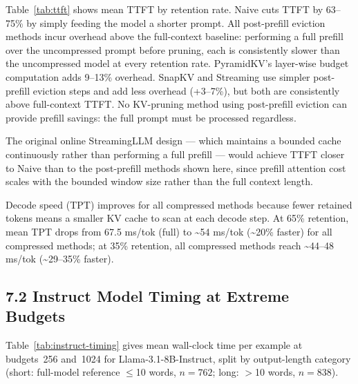 \documentclass[10pt,letterpaper]{article}
\begin{document}
Table~\ref{tab:ttft} shows mean TTFT by retention rate.
Naive cuts TTFT by 63--75\% by simply feeding the model a shorter
prompt. All post-prefill eviction methods incur overhead above the
full-context baseline: performing a full prefill over the uncompressed
prompt before pruning, each is consistently slower than the uncompressed
model at every retention rate. PyramidKV's layer-wise budget computation
adds 9--13\% overhead. SnapKV and Streaming use simpler post-prefill eviction steps and add less
overhead (+3--7\%), but both are consistently above full-context TTFT. No
KV-pruning method using post-prefill eviction can provide prefill savings:
the full prompt must be processed regardless.

The original online StreamingLLM design --- which
maintains a bounded cache continuously rather than performing a full
prefill --- would achieve TTFT closer to Naive than to the post-prefill
methods shown here, since prefill attention cost scales with the bounded
window size rather than the full context length.

Decode speed (TPT) improves for all compressed methods because
fewer retained tokens means a smaller KV cache to scan at each decode
step. At 65\% retention, mean TPT drops from 67.5 ms/tok (full) to
\textasciitilde54 ms/tok (\textasciitilde20\% faster) for all compressed
methods; at 35\% retention, all compressed methods reach
\textasciitilde44--48 ms/tok (\textasciitilde29--35\% faster).

\subsection{7.2 Instruct Model Timing at Extreme Budgets}\label{instruct-model-timing}

Table~\ref{tab:instruct-timing} gives mean wall-clock time per example at budgets~256 and~1024 for Llama-3.1-8B-Instruct, split by output-length category (short: full-model reference $\leq$10 words, $n=762$; long: $>$10 words, $n=838$).
\end{document}
